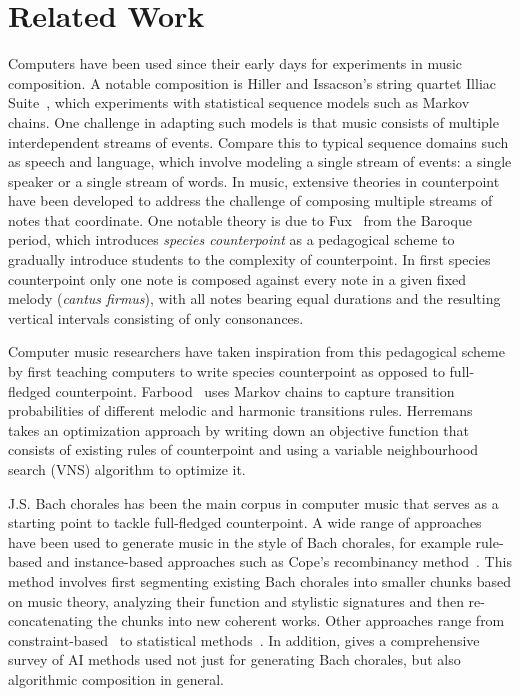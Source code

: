 \documentclass{article}
\begin{document}
\section{Related Work} \label{sec:related}
Computers have been used since their early days for experiments in music composition.  A notable composition is Hiller and Issacson's string quartet Illiac Suite~\cite{hiller1957musical}, which experiments with statistical sequence models such as Markov chains.  One challenge in adapting such models is that music consists of multiple interdependent streams of events.  Compare this to typical sequence domains such as speech and language, which involve modeling a single stream of events: a single speaker or a single stream of words.  In music, extensive theories in counterpoint have been developed to address the challenge of composing multiple streams of notes that coordinate.  One notable theory is due to Fux~\cite{fux1965study} from the Baroque period, which introduces \emph{species counterpoint} as a pedagogical scheme to gradually introduce students to the complexity of counterpoint.   In first species counterpoint only one note is composed against every note in a given fixed melody (\emph{cantus firmus}), with all notes bearing equal durations and the resulting vertical intervals consisting of only consonances.    


Computer music researchers have taken inspiration from this pedagogical scheme by first teaching computers to write species counterpoint as opposed to full-fledged counterpoint.  Farbood~\cite{farbood2001analysis} uses Markov chains to capture transition probabilities of different melodic and harmonic transitions rules.  Herremans~\cite{herremans2012composing, herremans2013composing} takes an optimization approach by writing down an objective function that consists of existing rules of counterpoint and using a variable neighbourhood search (VNS) algorithm to optimize it.

J.S. Bach chorales has been the main corpus in computer music that serves as a starting point to tackle full-fledged counterpoint.  A wide range of approaches have been used to generate music in the style of Bach chorales, for example rule-based and instance-based approaches such as Cope's recombinancy method~\cite{cope1991computers}.  This method involves first segmenting existing Bach chorales into smaller chunks based on music theory, analyzing their function and stylistic signatures and then re-concatenating the chunks into new coherent works.
Other approaches range from  constraint-based~\cite{pachet2001musical} to statistical methods~\cite{conklin2003music}.  In addition, \cite{fernandez2013ai} gives a comprehensive survey of AI methods used not just for generating Bach chorales, but also algorithmic composition in general.  
\end{document}
